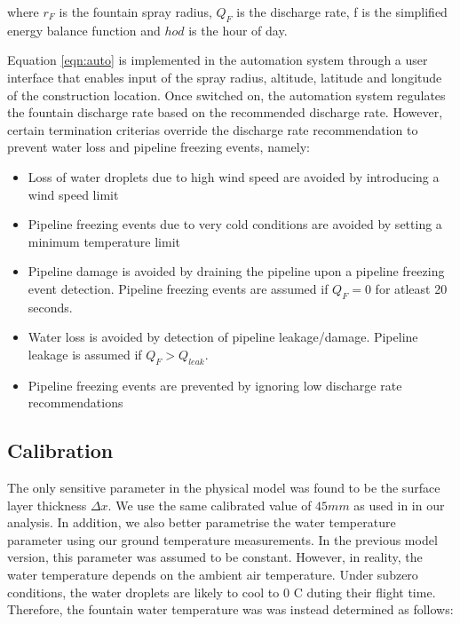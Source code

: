 \documentclass[tc, manuscript]{copernicus}
\begin{document}
where $r_F$ is the fountain spray radius, $Q_{F}$ is the discharge rate, f is the simplified energy balance
function and $hod$ is the hour of day.

Equation \ref{eqn:auto} is implemented in the automation system through a user interface that enables input of
the spray radius, altitude, latitude and longitude of the construction location. Once switched on, the
automation system regulates the fountain discharge rate based on the recommended discharge rate. However,
certain termination criterias override the discharge rate recommendation to prevent water loss and pipeline
freezing events, namely: 

\begin{itemize}

\item Loss of water droplets due to high wind speed are avoided by introducing a wind speed limit 

\item Pipeline freezing events due to very cold conditions are avoided by setting a minimum temperature limit 

\item Pipeline damage is avoided by draining the pipeline upon a pipeline freezing event detection. Pipeline
  freezing events are assumed if $Q_F = 0$ for atleast 20 seconds.

\item Water loss is avoided by detection of pipeline leakage/damage. Pipeline leakage is assumed if $Q_F > Q_{leak}$. 

\item Pipeline freezing events are prevented by ignoring low discharge rate recommendations  

\end{itemize}

\subsection{Calibration}
The only sensitive parameter in the physical model was found to be the surface layer thickness $\Delta x$. We
use the same calibrated value of $45 mm$ as used in \cite{balasubramanianInfluenceMeteorologicalConditions2022}
in our analysis. In addition, we also better parametrise the water temperature parameter using our ground
temperature measurements. In the previous model version, this parameter was assumed to be constant. However, in
reality, the water temperature depends on the ambient air temperature. Under subzero conditions, the water
droplets are likely to cool to 0 C duting their flight time. Therefore, the fountain water temperature was
was instead determined as follows:
\end{document}
